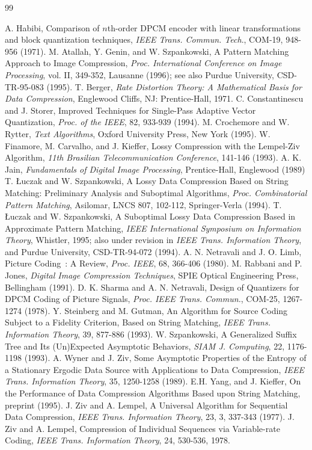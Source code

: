 \documentclass[11pt,a4paper]{article}
\begin{document}
\begin{thebibliography}{99}

\footnotesize


A. Habibi, 
Comparison of $n$th-order DPCM encoder
with linear transformations and block quantization techniques, 
{\it IEEE Trans. Commun. Tech}., COM-19, 948-956 (1971).
M. Atallah, Y. Genin, and W. Szpankowski,
A Pattern Matching Approach to Image Compression,
{\it Proc. International Conference on Image Processing}, vol. II,  349-352,
Lausanne (1996); see also
Purdue University, CSD-TR-95-083 (1995).
T. Berger,
{\it Rate Distortion Theory: A Mathematical Basis for Data Compression},
Englewood Cliffs, NJ: Prentice-Hall, 1971.
C. Constantinescu and J. Storer,
Improved Techniques for Single-Pass Adaptive Vector
Quantization, {\it Proc. of the IEEE}, 82, 933-939 (1994).
M. Crochemore and W. Rytter,
{\it Text Algorithms}, Oxford University Press, New York  (1995).
W. Finamore, M. Carvalho, and J. Kieffer,
Lossy Compression with the Lempel-Ziv Algorithm,
{\it 11th Brasilian Telecommunication Conference}, 141-146 (1993).
A. K. Jain,
{\it Fundamentals of Digital Image Processing}, Prentice-Hall,
Englewood (1989)
T. \L uczak and W. Szpankowski,
A Lossy Data Compression Based on String Matching: Preliminary
Analysis and Suboptimal Algorithms,
{\it Proc. Combinatorial Pattern Matching}, Asilomar,
LNCS 807, 102-112, Springer-Verla  (1994).
T. \L uczak and W. Szpankowski,
A Suboptimal Lossy Data Compression Based in Approximate Pattern Matching,
{\it IEEE International Symposium on Information Theory}, Whistler, 1995;
also under revision in {\it IEEE Trans. Information Theory},
and Purdue University, CSD-TR-94-072 (1994).
A. N. Netravali and J. O. Limb, 
Picture Coding~: A Review,
{\it Proc. IEEE}, 68, 366-406 (1980).
M. Rabbani and P. Jones,
{\it Digital Image Compression Techniques}, SPIE Optical Engineering Press,
Bellingham (1991).
D. K. Sharma and A. N. Netravali, 
Design of Quantizers for DPCM Coding of Picture Signals, 
{\it Proc. IEEE Trans. Commun.}, COM-25, 1267-1274 (1978).
Y. Steinberg and M. Gutman,
An Algorithm for Source Coding Subject to a Fidelity Criterion,
Based on String Matching,
{\it IEEE Trans. Information Theory}, 39,  877-886 (1993).
W. Szpankowski,
A Generalized Suffix Tree and Its (Un)Expected Asymptotic Behaviors,
{\it SIAM J. Computing}, 22, 1176-1198  (1993).
A. Wyner and J. Ziv,
Some Asymptotic Properties of the Entropy of a Stationary Ergodic Data Source
with Applications to Data Compression,
{\it IEEE Trans. Information Theory}, 35, 1250-1258  (1989).
E.H. Yang, and J. Kieffer,
On the Performance of Data Compression Algorithms Based upon String Matching,
preprint (1995).
J. Ziv and A. Lempel,
A Universal Algorithm for Sequential Data Compression, {\it IEEE
Trans. Information Theory}, 23, 3, 337-343 (1977).
J. Ziv and A. Lempel,
Compression of Individual Sequences via Variable-rate Coding,
{\it IEEE Trans. Information Theory}, 24, 530-536, 1978.


\end{thebibliography}
\end{document}
